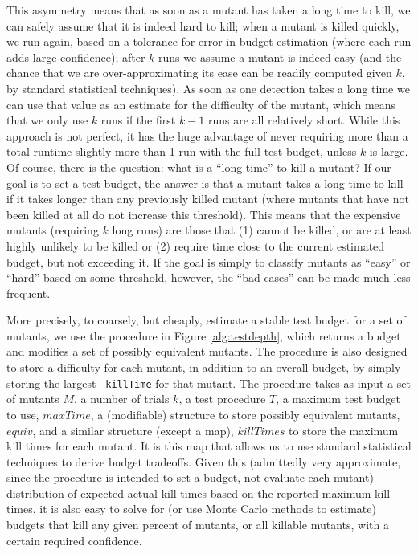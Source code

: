 \documentclass{svjour3}
\begin{document}
This asymmetry means that as soon as a mutant has taken a long time to kill, we
can safely assume that it is indeed hard to kill; when a mutant is killed
quickly, we run again, based on a tolerance for error in budget
estimation (where each run adds large confidence); after $k$ runs we
assume a mutant is indeed easy (and the chance that we are
over-approximating its ease can be readily computed given $k$, by
standard statistical techniques).  As soon as one
detection takes a long time  we can use that
value as an estimate for the difficulty of the mutant, which means
that we only use $k$ runs if the first $k-1$ runs are all relatively short.  While this
approach is not perfect, it has the huge advantage of never requiring
more than a total runtime slightly more than 1 run with the full test
budget, unless $k$ is large.  Of course, there is the question:  what
is a ``long time'' to kill a mutant?  If our goal is to set a test
budget, the answer is that a mutant takes a long time to kill if it
takes longer than any previously killed mutant (where mutants that
have not been killed at all do not increase this threshold).  This
means that the expensive mutants (requiring $k$ long runs) are those
that (1) cannot be killed, or are at least highly unlikely to be
killed or (2) require time close to the current estimated
budget, but not exceeding it.  If the goal is simply to classify
mutants as ``easy'' or ``hard'' based on some threshold, however, the
``bad cases'' can be made much less frequent.

More precisely, to coarsely, but
cheaply, estimate a stable test
budget for a set of mutants, we use the procedure in Figure
\ref{alg:testdepth}, which returns a budget and modifies a set of
possibly equivalent mutants.  The procedure is also designed to store a
difficulty for each mutant, in addition to an overall budget, by simply storing the largest {\tt
  killTime} for that mutant.  The procedure takes as input a set of
mutants $M$, a number of trials $k$, a test procedure $T$, a maximum
test budget to use, $maxTime$, a (modifiable) structure to store
possibly equivalent mutants, $equiv$, and a similar structure (except
a map), $killTimes$ to store the maximum kill times for each mutant.
It is this map that allows us to use standard statistical techniques
to derive budget tradeoffs.  Given this (admittedly very approximate, since the
procedure is intended to set a budget, not evaluate each mutant) distribution of expected actual
kill times based on the reported maximum kill times, it is also easy to
solve for (or use Monte Carlo methods to estimate) budgets that kill
any given percent of mutants, or all killable mutants, with a certain
required confidence.
\end{document}
